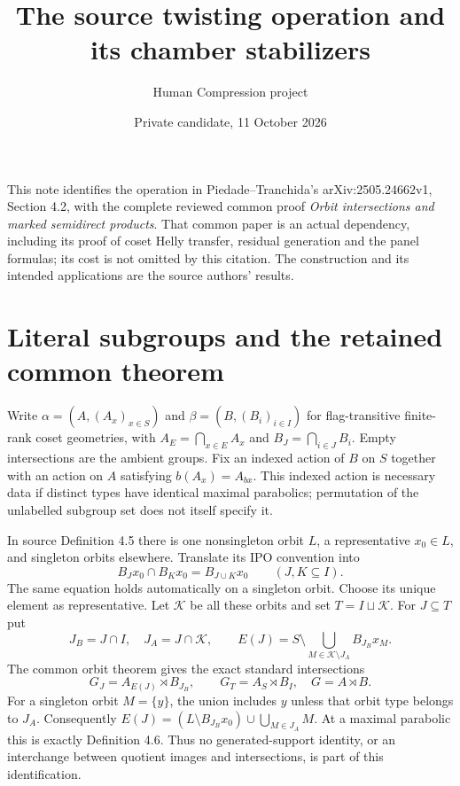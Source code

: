
\title{The source twisting operation and its chamber stabilizers}
\author{Human Compression project}
\date{Private candidate, 11 October 2026}
\maketitle
This note identifies the operation in Piedade--Tranchida's
arXiv:2505.24662v1, Section 4.2, with the complete reviewed
common proof \emph{Orbit intersections and marked semidirect products}.
That common paper is an actual dependency, including its proof of
coset Helly transfer, residual generation and the panel formulas;
its cost is not omitted by this citation. The construction and its
intended applications are the source authors' results.

\section{Literal subgroups and the retained common theorem}
Write $\alpha=(A,(A_x)_{x\in S})$ and
$\beta=(B,(B_i)_{i\in I})$ for flag-transitive finite-rank coset
geometries, with $A_E=\bigcap_{x\in E}A_x$ and
$B_J=\bigcap_{i\in J}B_i$. Empty intersections are the ambient
groups. Fix an indexed action of $B$ on $S$ together with an action
on $A$ satisfying $b(A_x)=A_{bx}$. This indexed action is necessary
data if distinct types have identical maximal parabolics; permutation
of the unlabelled subgroup set does not itself specify it.

In source Definition 4.5 there is one nonsingleton orbit $L$, a
representative $x_0\in L$, and singleton orbits elsewhere. Translate
its IPO convention into
\[
 B_Jx_0\cap B_Kx_0=B_{J\cup K}x_0
 \qquad(J,K\subseteq I).
\]
The same equation holds automatically on a singleton orbit. Choose
its unique element as representative. Let $\mathcal K$ be all these
orbits and set $T=I\sqcup\mathcal K$. For $J\subseteq T$ put
\[
 J_B=J\cap I,\quad J_A=J\cap\mathcal K,\qquad
 E(J)=S\setminus\bigcup_{M\in\mathcal K\setminus J_A}B_{J_B}x_M.
\]
The common orbit theorem gives the exact standard intersections
\begin{equation}\label{eq:intersection}
 G_J=A_{E(J)}\rtimes B_{J_B},\qquad
 G_T=A_S\rtimes B_I,
 \quad G=A\rtimes B.
\end{equation}
For a singleton orbit $M=\{y\}$, the union includes $y$ unless that
orbit type belongs to $J_A$. Consequently
$E(J)=(L\setminus B_{J_B}x_0)\cup\bigcup_{M\in J_A}M$.
At a maximal parabolic this is exactly Definition 4.6. Thus no
generated-support identity, or an interchange between quotient
images and intersections, is part of this identification.

